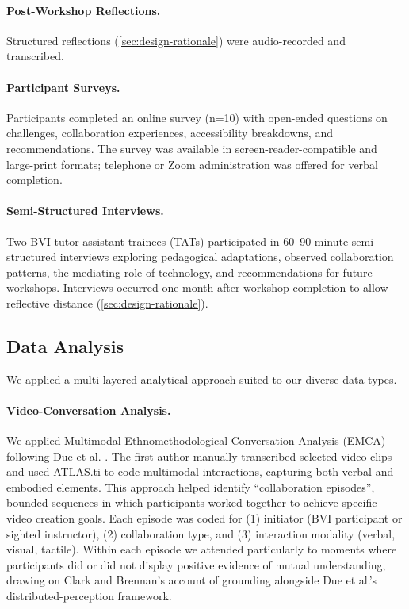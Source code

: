 \paragraph{Post-Workshop Reflections.}
Structured reflections (\autoref{sec:design-rationale}) were audio-recorded and transcribed.

\paragraph{Participant Surveys.}
Participants completed an online survey (n=10) with open-ended questions on challenges, collaboration experiences, accessibility breakdowns, and recommendations. The survey was available in screen-reader-compatible and large-print formats; telephone or Zoom administration was offered for verbal completion.

\paragraph{Semi-Structured Interviews.}
Two BVI tutor-assistant-trainees (TATs) participated in 60--90-minute semi-structured interviews exploring pedagogical adaptations, observed collaboration patterns, the mediating role of technology, and recommendations for future workshops. Interviews occurred one month after workshop completion to allow reflective distance (\autoref{sec:design-rationale}).

\subsection{Data Analysis}

We applied a multi-layered analytical approach suited to our diverse data types.

\paragraph{Video-Conversation Analysis.}
We applied Multimodal Ethnomethodological Conversation Analysis (EMCA) following Due et al. \cite{due_distributed_2021}. The first author manually transcribed selected video clips and used ATLAS.ti \cite{atlasti_scientific_software_development_gmbh_atlasti_2023} to code multimodal interactions, capturing both verbal and embodied elements. This approach helped identify ``collaboration episodes'', bounded sequences in which participants worked together to achieve specific video creation goals. Each episode was coded for (1) initiator (BVI participant or sighted instructor), (2) collaboration type, and (3) interaction modality (verbal, visual, tactile). Within each episode we attended particularly to moments where participants did or did not display positive evidence of mutual understanding, drawing on Clark and Brennan's \cite{clark_grounding_1991} account of grounding alongside Due et al.'s distributed-perception framework.

